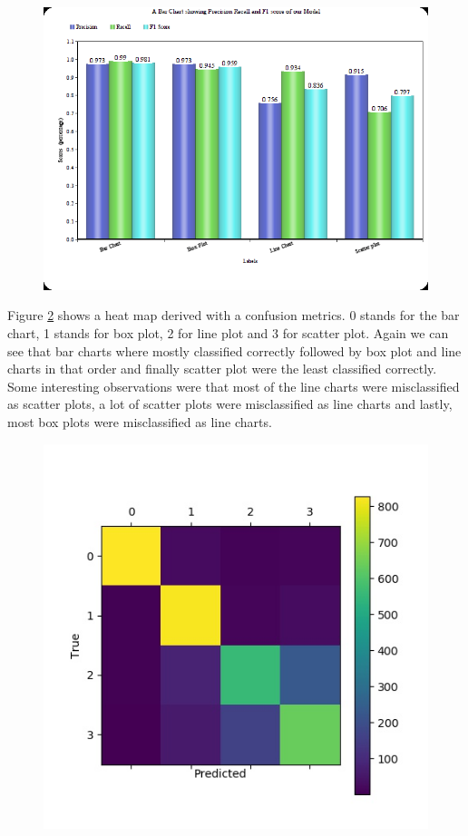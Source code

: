 \documentclass[12pt, a4paper,oneside]{report}
\begin{document}
\begin{figure}[!htbp]
	\includegraphics [scale=0.78] {scores.png}
	\label{fig:matrics}
\end{figure}

Figure \ref{fig:confusion} shows a heat map derived with a confusion metrics. 0 stands for the bar chart, 1 stands for box plot, 2 for line plot and 3 for scatter plot. Again we can see that bar charts where mostly classified correctly followed by box plot and line charts in that order and finally scatter plot were the least classified correctly. Some interesting observations were that most of the line charts were misclassified as scatter plots, a lot of scatter plots were misclassified as line charts  
and lastly, most box plots were misclassified as line charts.

\begin{figure}[!htbp]
	\includegraphics [scale=1.2] {confusion.jpg}
	\label{fig:confusion}
\end{figure}
\end{document}
